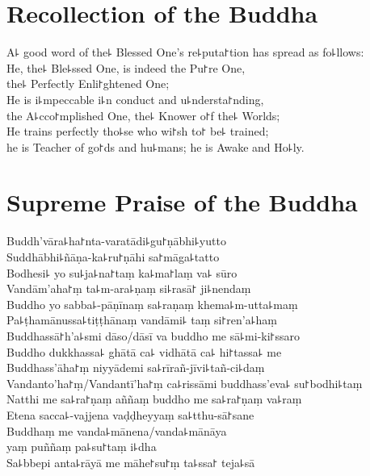
\nextChapterUseDelegatedPageNumber

\chapter{Recollection of the Buddha}%

\begin{leader}
\end{leader}

A꜕ good word of the꜕ Blessed One's re꜕puta꜓tion has spread as fo꜕llows:\\
He, the꜕ Ble꜕ssed One, is indeed the Pu꜓re One,\\
\vin the꜕ Perfectly Enli꜓ghtened One;\\
He is i꜕mpeccable i꜕n conduct and u꜕ndersta꜓nding,\\
\vin the A꜕cco꜓mplished One, the꜕ Knower o꜓f the꜕ Worlds;\\
He trains perfectly tho꜕se who wi꜓sh to꜓ be꜕ trained;\\
\vin he is Teacher of go꜓ds and hu꜕mans; he is Awake and Ho꜕ly.

\clearpage

\chapter*{Supreme Praise of the Buddha}%

\delegateSetUseNext

\begin{leader}
\end{leader}

Buddh'vāra꜕ha꜓nta-varatādi꜕gu꜓ṇābhi꜕yutto\\
Suddhābhi꜕ñāṇa-ka꜕ru꜓ṇāhi sa꜓māga꜕tatto\\
Bodhesi꜕ yo su꜕ja꜕na꜓taṃ ka꜕ma꜓laṃ va꜕ sūro\\
Vandām'aha꜓ṃ ta꜕m-ara꜕ṇaṃ si꜕rasā꜓ ji꜕nendaṃ\\
Buddho yo sabba꜕-pāṇīnaṃ sa꜕raṇaṃ khema꜕m-utta꜕maṃ\\
Pa꜕ṭhamānussa꜕tiṭṭhānaṃ vandāmi꜕ taṃ si꜓ren'a꜕haṃ\\
Buddhassā꜓h'a꜕smi dāso/dāsī va buddho me sā꜕mi-ki꜓ssaro\\
Buddho dukkhassa꜕ ghātā ca꜕ vidhātā ca꜕ hi꜓tassa꜕ me\\
Buddhass'āha꜓ṃ niyyādemi sa꜕rīrañ-jīvi꜕tañ-ci꜕daṃ\\
Vandanto'ha꜓ṃ/Vandantī'ha꜓ṃ ca꜕rissāmi buddhass'eva꜕ su꜓bodhi꜕taṃ\\
Natthi me sa꜕ra꜓ṇaṃ aññaṃ buddho me sa꜕ra꜓ṇaṃ va꜕raṃ\\
Etena sacca꜕-vajjena vaḍḍheyyaṃ sa꜕tthu-sā꜓sane\\
Buddhaṃ me vanda꜕mānena/vanda꜕mānāya\\
\vin yaṃ puññaṃ pa꜕su꜓taṃ i꜕dha\\
Sa꜕bbepi anta꜕rāyā me māhe꜓su꜓ṃ ta꜕ssa꜓ teja꜕sā

